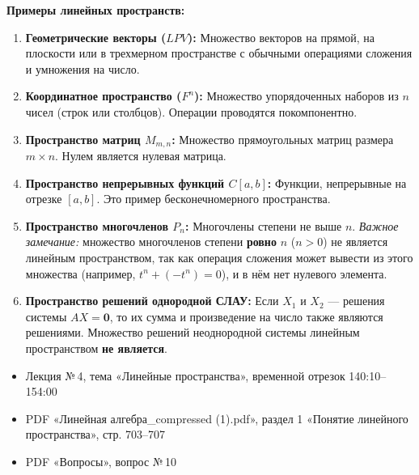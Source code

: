 \textbf{Примеры линейных пространств:}
\begin{enumerate}
    \item \textbf{Геометрические векторы ($LPV$):} Множество векторов на прямой, на плоскости или в трехмерном пространстве с обычными операциями сложения и умножения на число.
    \item \textbf{Координатное пространство ($F^n$):} Множество упорядоченных наборов из $n$ чисел (строк или столбцов). Операции проводятся покомпонентно.
    \item \textbf{Пространство матриц $M_{m,n}$:} Множество прямоугольных матриц размера $m \times n$. Нулем является нулевая матрица.
    \item \textbf{Пространство непрерывных функций $C[a, b]$:} Функции, непрерывные на отрезке $[a, b]$. Это пример бесконечномерного пространства.
    \item \textbf{Пространство многочленов $P_n$:} Многочлены степени не выше $n$. \textit{Важное замечание:} множество многочленов степени \textbf{ровно} $n$ ($n > 0$) не является линейным пространством, так как операция сложения может вывести из этого множества (например, $t^n + (-t^n) = 0$), и в нём нет нулевого элемента.
    \item \textbf{Пространство решений однородной СЛАУ:} Если $X_1$ и $X_2$ — решения системы $AX = \mathbf{0}$, то их сумма и произведение на число также являются решениями. Множество решений неоднородной системы линейным пространством \textbf{не является}.
\end{enumerate}

\begin{tcolorbox}[title=Источники, colback=gray!10]
\begin{itemize}
  \item Лекция №\,4, тема «Линейные пространства», временной отрезок 140:10--154:00
  \item PDF «Линейная алгебра\_compressed (1).pdf», раздел 1 «Понятие линейного пространства», стр. 703--707
  \item PDF «Вопросы», вопрос №\,10
\end{itemize}
\end{tcolorbox}
